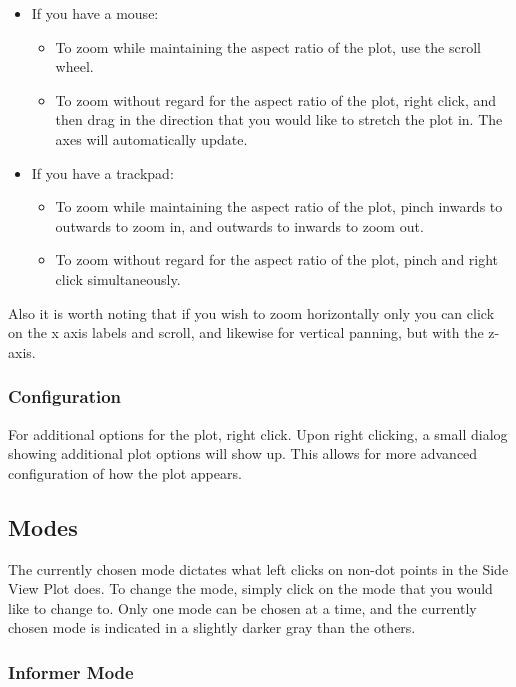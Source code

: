 \documentclass[titlepage]{article}
\begin{document}
\begin{itemize}
	\item If you have a mouse:
		\begin{itemize}
			\item To zoom while maintaining the aspect ratio of the plot, use the scroll wheel.
			\item To zoom without regard for the aspect ratio of the plot, right click, and then drag in the direction that you would like to stretch the plot in. The axes will automatically update.
		\end{itemize}

	\item If you have a trackpad:
		\begin{itemize}
			\item To zoom while maintaining the aspect ratio of the plot, pinch inwards to outwards to zoom in, and outwards to inwards to zoom out.
			\item To zoom without regard for the aspect ratio of the plot, pinch and right click simultaneously. 
		\end{itemize}
\end{itemize}

Also it is worth noting that if you wish to zoom horizontally only you can click on the x axis labels and scroll, and likewise for vertical panning, but with the z-axis.

\subsubsection{Configuration}
For additional options for the plot, right click. Upon right clicking, a small dialog showing additional plot options will show up. This allows for more advanced configuration of how the plot appears.

\subsection{Modes}
The currently chosen mode dictates what left clicks on non-dot points in the Side View Plot does. To change the mode, simply click on the mode that you would like to change to. Only one mode can be chosen at a time, and the currently chosen mode is indicated in a slightly darker gray than the others.

\subsubsection{Informer Mode}
\end{document}
